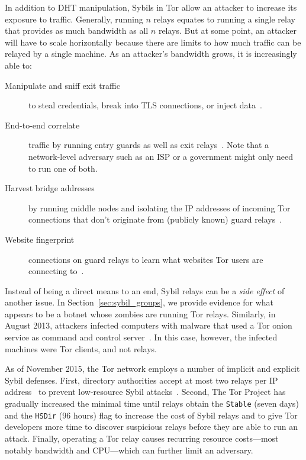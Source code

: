 In addition to DHT manipulation, Sybils in Tor allow an attacker to increase its
exposure to traffic.  Generally, running $n$ relays equates to running a single
relay that provides as much bandwidth as all $n$ relays.  But at some point, an
attacker will have to scale horizontally because there are limits to how much
traffic can be relayed by a single machine.  As an attacker's bandwidth grows,
it is increasingly able to:
\begin{description}
	\item[Manipulate and sniff exit traffic] to steal credentials, break into
		TLS connections, or inject data~\cite{Winter2014a}.
	\item[End-to-end correlate] traffic by running entry guards as well as exit
		relays~\cite{Johnson2013a}.  Note that a network-level adversary such as
		an ISP or a government might only need to run one of both.
	\item[Harvest bridge addresses] by running middle nodes and isolating the
		IP addresses of incoming Tor connections that don't originate from
		(publicly known) guard relays~\cite{Ling2012a}.
	\item[Website fingerprint] connections on guard relays to learn what
		websites Tor users are connecting to~\cite{Juarez2014a}.
\end{description}

Instead of being a direct means to an end, Sybil relays can be a \emph{side
effect} of another issue.  In Section~\ref{sec:sybil_groups}, we provide
evidence for what appears to be a botnet whose zombies are running Tor relays.
Similarly, in August 2013, attackers infected computers with malware that used a
Tor onion service as command and control server~\cite{Hopper2014a}.  In this
case, however, the infected machines were Tor clients, and not relays.

As of November 2015, the Tor network employs a number of implicit and explicit
Sybil defenses.  First, directory authorities accept at most two relays per IP
address~\cite{Bauer2007b} to prevent low-resource Sybil
attacks~\cite{Bauer2007a}.  Second, The Tor Project has gradually increased the
minimal time until relays obtain the \texttt{Stable} (seven days) and the
\texttt{HSDir} (96 hours) flag to increase the cost of Sybil relays and to give
Tor developers more time to discover suspicious relays before they are able to
run an attack.  Finally, operating a Tor relay causes recurring resource
costs---most notably bandwidth and CPU---which can further limit an adversary.

